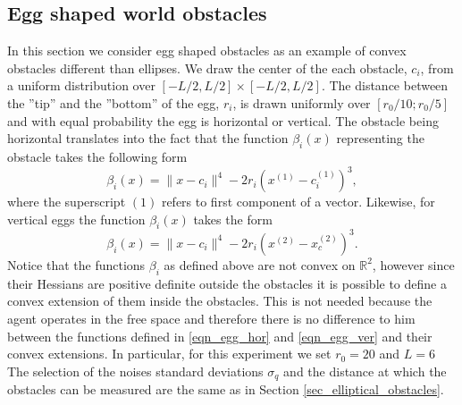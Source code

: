 \documentclass[article]{IEEEtran}
\theoremstyle{definition}
\begin{document}
\subsection{Egg shaped world obstacles}\label{sec_egg_shaped}
%
In this section we consider egg shaped obstacles as an example of convex obstacles different than ellipses. We draw the center of the each obstacle, $c_i$, from a uniform distribution over $[-L/2, L/2] \times [-L/2, L/2]$. The distance between the ''tip'' and the ''bottom'' of the egg, $r_i$, is drawn uniformly over $[r_0/10; r_0/5]$ and with equal probability the egg is horizontal or vertical. The obstacle being horizontal translates into the fact that the function $\beta_i(x)$ representing the obstacle takes the following form
%
\begin{equation}\label{eqn_egg_hor}
\beta_i(x) = \|x-c_i \|^4 - 2r_i \left(  x^{(1)} - c_i^{(1)}\right)^3,
\end{equation}
%
where the superscript $(1)$ refers to first component of a vector. Likewise, for vertical eggs the function $\beta_i(x)$ takes the form
%
\begin{equation}\label{eqn_egg_ver}
\beta_i(x) = \|x-c_i \|^4 - 2r_i \left(  x^{(2)} - x_c^{(2)}\right)^3.
\end{equation}
%
Notice that the functions $\beta_i$ as defined above are not convex on $\mathbb{R}^2$, however since their Hessians are positive definite outside the obstacles it is possible to define a convex extension of them inside the obstacles. This is not needed because the agent operates in the free space and therefore there is no difference to him between the functions defined in \eqref{eqn_egg_hor} and \eqref{eqn_egg_ver} and their convex extensions. In particular, for this experiment we set $r_0=20$ and $L=6$ The selection of the noises standard deviations $\sigma_q$ and the distance at which the obstacles can be measured are the same as in Section \ref{sec_elliptical_obstacles}.
\end{document}
